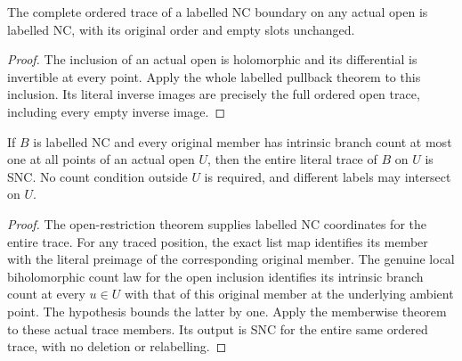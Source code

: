 \begin{corollary}
\label{hir:labelled-nc-actual-open-restriction}
\leanok
The complete ordered trace of a labelled NC boundary on any actual
open is labelled NC, with its original order and empty slots unchanged.
\end{corollary}
\begin{proof}
The inclusion of an actual open is holomorphic and its differential
is invertible at every point. Apply the whole labelled pullback theorem
to this inclusion. Its literal inverse images are precisely the full
ordered open trace, including every empty inverse image.
\end{proof}

\begin{theorem}
\label{hir:labelled-nc-memberwise-original-open-snc}
\leanok
If $B$ is labelled NC and every original member has intrinsic branch
count at most one at all points of an actual open $U$, then the entire
literal trace of $B$ on $U$ is SNC. No count condition outside $U$ is
required, and different labels may intersect on $U$.
\end{theorem}
\begin{proof}
The open-restriction theorem supplies labelled NC coordinates for the
entire trace. For any traced position, the exact list map identifies
its member with the literal preimage of the corresponding original
member. The genuine local biholomorphic count law for the open
inclusion identifies its intrinsic branch count at every $u\in U$
with that of this original member at the underlying ambient point.
The hypothesis bounds the latter by one. Apply the memberwise theorem
to these actual trace members. Its output is SNC for the entire same
ordered trace, with no deletion or relabelling.
\end{proof}
